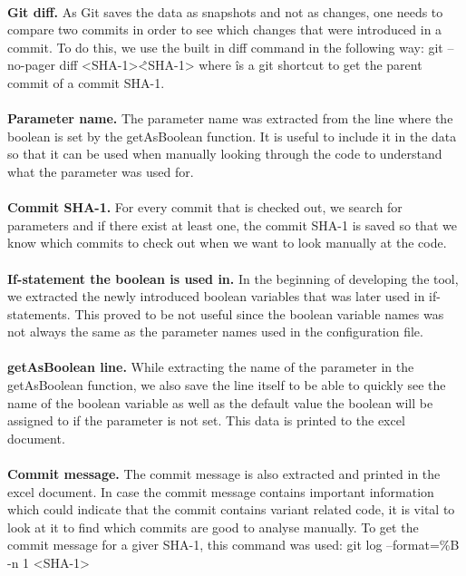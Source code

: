 \paragraph*{}
\textbf{Git diff.} As Git saves the data as snapshots and not as changes, one needs to compare two commits in order to see which changes that were introduced in a commit. To do this, we use the built in diff command in the following way: 
git --no-pager diff <SHA-1>\^ <SHA-1>
where \^ is a git shortcut to get the parent commit of a commit SHA-1.
\paragraph*{}
\textbf{Parameter name.} The parameter name was extracted from the line where the boolean is set by the getAsBoolean function. It is useful to include it in the data so that it can be used when manually looking through the code to understand what the parameter was used for.
\paragraph*{}
\textbf{Commit SHA-1.} For every commit that is checked out, we search for parameters and if there exist at least one, the commit SHA-1 is saved so that we know which commits to check out when we want to look manually at the code.
\paragraph*{}
\textbf{If-statement the boolean is used in.} In the beginning of developing the tool, we extracted the newly introduced boolean variables that was later used in if-statements. This proved to be not useful since the boolean variable names was not always the same as the parameter names used in the configuration file.
\paragraph*{}
\textbf{getAsBoolean line.} While extracting the name of the parameter in the getAsBoolean function, we also save the line itself to be able to quickly see the name of the boolean variable as well as the default value the boolean will be assigned to if the parameter is not set. This data is printed to the excel document.
\paragraph*{}
\textbf{Commit message.} The commit message is also extracted and printed in the excel document. In case the commit message contains important information which could indicate that the commit contains variant related code, it is vital to look at it to find which commits are good to analyse manually.
To get the commit message for a giver SHA-1, this command was used:
git log --format=\%B -n 1 <SHA-1>
